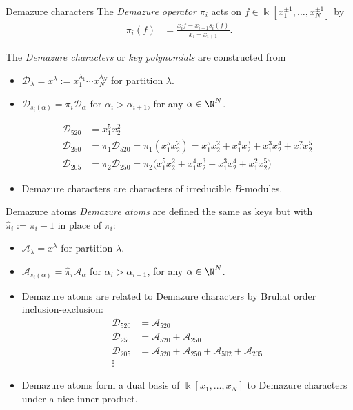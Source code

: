 \documentclass[dvipsnames]{beamer}
\newcommand{\kk}{\Bbbk}
\newcommand{\Acal}{{\mathcal A}}
\newcommand{\Dcal}{{\mathcal D}}
\theoremstyle{definition}
\newcounter{c}
\begin{document}
\begin{frame}{Demazure characters}
  The \emph{Demazure operator} $\pi_i$
  acts on $f \in \kk[x_1^{\pm 1}, \dots, x_N^{\pm 1}]$ by
  \vspace{-1mm}
  \begin{align*}
  \pi_i(f) &= \frac{x_if-x_{i+1}s_i(f)}{x_i-x_{i+1}}.
  \end{align*}\pause

  The \emph{Demazure characters} or \emph{key polynomials} are
  constructed from
  \begin{itemize}
  \item  $\Dcal_{\lambda} = x^\lambda := x_1^{\lambda_1}\cdots x_N^{\lambda_N}$ for partition  $\lambda$.
  \item $\Dcal_{s_i(\alpha)} = \pi_i \Dcal_{\alpha}$ for  $\alpha_i > \alpha_{i+1}$, for any  $\alpha \in \N^N$.

\pause
    \begin{align*}
\Dcal_{520} & = x_1^5x_2^2  \\[.8mm] 
\Dcal_{250} & = \pi_{1}\Dcal_{520}=\pi_1(x_1^5x_2^2) = x_1^5x_2^2 + x_1^4 x_2^3 + x_1^3 x_2^4 + x_1^2x_2^5 \\[.8mm]
\Dcal_{205} & = \pi_2 \Dcal_{250} = \pi_2 \big(x_1^5x_2^2 + x_1^4 x_2^3 + x_1^3 x_2^4 + x_1^2x_2^5\big)
\end{align*}\pause
  \item Demazure characters are characters of irreducible \(B\)-modules.
  \end{itemize}
\end{frame}
\begin{frame}{Demazure atoms}
\emph{Demazure atoms} are defined the same as keys but with
$\hat{\pi}_i := \pi_i-1$ in place of  $\pi_i$:
\begin{itemize}
\item \(\Acal_\lambda = x^\lambda\) for partition \(\lambda\).
\item \(\Acal_{s_i(\alpha)} = \hat{\pi}_i \Acal_\alpha\) for \(\alpha_i >
  \alpha_{i+1}\), for any \(\alpha \in \N^N\).\pause
\item Demazure atoms are related to Demazure characters by Bruhat
  order inclusion-exclusion:
\begin{align*}
  \Dcal_{520} & = \Acal_{520}\\
  \Dcal_{250} & = \Acal_{520} + \Acal_{250}\\
  \Dcal_{205} & = \Acal_{520} + \Acal_{250} + \Acal_{502} +
                \Acal_{205}\\
  \vdots
\end{align*}\pause
\item Demazure atoms form a dual basis of \(\kk[x_1,\ldots,x_N]\) to
  Demazure characters under a nice inner product.
\end{itemize}
\vspace{5mm}
\end{frame}
\end{document}

